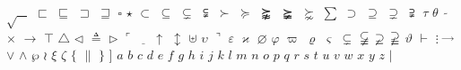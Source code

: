 \documentclass{article}
\begin{document}
$\sqrt{\;\;\;}$
$\sqsubset$
$\sqsubseteq$
$\sqsupset$
$\sqsupseteq$
$\square$
$\star$
$\subset$
$\subseteq$
$\subsetneq$
$\subsetneqq$
$\succ$
$\succeq$
$\succnapprox$
$\succneqq$
$\succnsim$
$\sum$
$\supset$
$\supseteq$
$\supsetneq$
$\supsetneqq$
$\tau$
$\theta$
$\tilde{\;\;\;}$
$\times$
$\to$
$\top$
$\triangle$
$\triangleleft$
$\triangleq$
$\triangleright$
$\ulcorner$
$\underline{\;\;\;}$
$\uparrow$
$\updownarrow$
$\uplus$
$\upsilon$
$\urcorner$
$\varepsilon$
$\varkappa$
$\varnothing$
$\varphi$
$\varpi$
$\varrho$
$\varsigma$
$\varsubsetneq$
$\varsubsetneqq$
$\varsupsetneq$
$\varsupsetneqq$
$\vartheta$
$\vdash$
$\vdots$
$\vec{\;\;\;}$
$\vee$
$\wedge$
$\wp$
$\wr$
$\xi$
$\zeta$
$\{$
$\|$
$\}$
$]$
$a$
$b$
$c$
$d$
$e$
$f$
$g$
$h$
$i$
$j$
$k$
$l$
$m$
$n$
$o$
$p$
$q$
$r$
$s$
$t$
$u$
$v$
$w$
$x$
$y$
$z$
$|$
\end{document}

